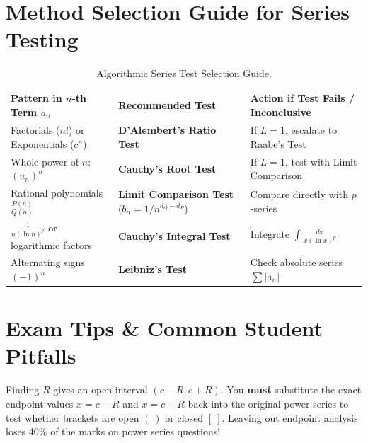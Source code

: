 \section{Method Selection Guide for Series Testing}

\begin{table}[htbp]
\centering
\small
\renewcommand{\arraystretch}{1.3}
\begin{tabularx}{\linewidth}{l>{\raggedright\arraybackslash}X>{\raggedright\arraybackslash}X}
\toprule
\textbf{Pattern in $n$-th Term $a_n$} & \textbf{Recommended Test} & \textbf{Action if Test Fails / Inconclusive} \\
\midrule
Factorials ($n!$) or Exponentials ($c^n$) & \textbf{D'Alembert's Ratio Test} & If $L=1$, escalate to Raabe's Test \\
Whole power of $n$: $(u_n)^n$ & \textbf{Cauchy's Root Test} & If $L=1$, test with Limit Comparison \\
Rational polynomials $\frac{P(n)}{Q(n)}$ & \textbf{Limit Comparison Test} ($b_n = 1/n^{d_Q - d_P}$) & Compare directly with $p$-series \\
$\frac{1}{n (\ln n)^p}$ or logarithmic factors & \textbf{Cauchy's Integral Test} & Integrate $\int \frac{dx}{x(\ln x)^p}$ \\
Alternating signs $(-1)^n$ & \textbf{Leibniz's Test} & Check absolute series $\sum |a_n|$ \\
\bottomrule
\end{tabularx}
\caption{Algorithmic Series Test Selection Guide.}
\label{tab:series-selection-guide}
\end{table}

\section{Exam Tips \& Common Student Pitfalls}

\begin{examtip}
Finding $R$ gives an open interval $(c-R, c+R)$. You \textbf{must} substitute the exact endpoint values $x = c-R$ and $x = c+R$ back into the original power series to test whether brackets are open $( \ )$ or closed $[ \ ]$. Leaving out endpoint analysis loses 40\% of the marks on power series questions!
\end{examtip}

